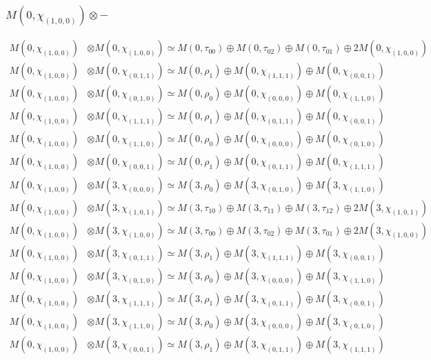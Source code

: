 \subsubsection{$ M(0,\chi_{(1,0,0)})\otimes -$}
\begin{align*}
M(0,\chi_{(1,0,0)}) &\otimes M(0,\chi_{(1,0,0)}) \simeq M(0,\tau_{00}) \oplus M(0,\tau_{02}) \oplus M(0,\tau_{01}) \oplus 2 M(0,\chi_{(1,0,0)})\\
M(0,\chi_{(1,0,0)}) &\otimes M(0,\chi_{(0,1,1)}) \simeq M(0,\rho_{1}) \oplus M(0,\chi_{(1,1,1)}) \oplus M(0,\chi_{(0,0,1)})\\
M(0,\chi_{(1,0,0)}) &\otimes M(0,\chi_{(0,1,0)}) \simeq M(0,\rho_{0}) \oplus M(0,\chi_{(0,0,0)}) \oplus M(0,\chi_{(1,1,0)})\\
M(0,\chi_{(1,0,0)}) &\otimes M(0,\chi_{(1,1,1)}) \simeq M(0,\rho_{1}) \oplus M(0,\chi_{(0,1,1)}) \oplus M(0,\chi_{(0,0,1)})\\
M(0,\chi_{(1,0,0)}) &\otimes M(0,\chi_{(1,1,0)}) \simeq M(0,\rho_{0}) \oplus M(0,\chi_{(0,0,0)}) \oplus M(0,\chi_{(0,1,0)})\\
M(0,\chi_{(1,0,0)}) &\otimes M(0,\chi_{(0,0,1)}) \simeq M(0,\rho_{1}) \oplus M(0,\chi_{(0,1,1)}) \oplus M(0,\chi_{(1,1,1)})\\
M(0,\chi_{(1,0,0)}) &\otimes M(3,\chi_{(0,0,0)}) \simeq M(3,\rho_{0}) \oplus M(3,\chi_{(0,1,0)}) \oplus M(3,\chi_{(1,1,0)})\\
M(0,\chi_{(1,0,0)}) &\otimes M(3,\chi_{(1,0,1)}) \simeq M(3,\tau_{10}) \oplus M(3,\tau_{11}) \oplus M(3,\tau_{12}) \oplus 2 M(3,\chi_{(1,0,1)})\\
M(0,\chi_{(1,0,0)}) &\otimes M(3,\chi_{(1,0,0)}) \simeq M(3,\tau_{00}) \oplus M(3,\tau_{02}) \oplus M(3,\tau_{01}) \oplus 2 M(3,\chi_{(1,0,0)})\\
M(0,\chi_{(1,0,0)}) &\otimes M(3,\chi_{(0,1,1)}) \simeq M(3,\rho_{1}) \oplus M(3,\chi_{(1,1,1)}) \oplus M(3,\chi_{(0,0,1)})\\
M(0,\chi_{(1,0,0)}) &\otimes M(3,\chi_{(0,1,0)}) \simeq M(3,\rho_{0}) \oplus M(3,\chi_{(0,0,0)}) \oplus M(3,\chi_{(1,1,0)})\\
M(0,\chi_{(1,0,0)}) &\otimes M(3,\chi_{(1,1,1)}) \simeq M(3,\rho_{1}) \oplus M(3,\chi_{(0,1,1)}) \oplus M(3,\chi_{(0,0,1)})\\
M(0,\chi_{(1,0,0)}) &\otimes M(3,\chi_{(1,1,0)}) \simeq M(3,\rho_{0}) \oplus M(3,\chi_{(0,0,0)}) \oplus M(3,\chi_{(0,1,0)})\\
M(0,\chi_{(1,0,0)}) &\otimes M(3,\chi_{(0,0,1)}) \simeq M(3,\rho_{1}) \oplus M(3,\chi_{(0,1,1)}) \oplus M(3,\chi_{(1,1,1)})\\

\end{align*}
